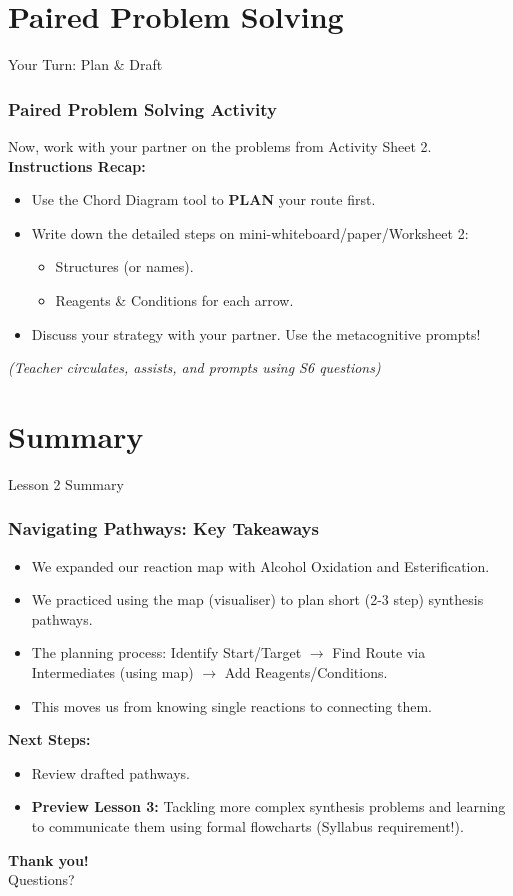 \documentclass[xcolor=svgnames]{beamer}
\begin{document}
\section{Paired Problem Solving}
\begin{frame}{Your Turn: Plan & Draft}
    \frametitle{Paired Problem Solving Activity}
    Now, work with your partner on the problems from Activity Sheet 2.
    \vspace{1em}
    \textbf{Instructions Recap:}
    \begin{itemize}
        \item Use the Chord Diagram tool to \textbf{PLAN} your route first.
        \item Write down the detailed steps on mini-whiteboard/paper/Worksheet 2:
            \begin{itemize}
                \item Structures (or names).
                \item Reagents \& Conditions for each arrow.
            \end{itemize}
        \item Discuss your strategy with your partner. Use the metacognitive prompts!
    \end{itemize}
    \vspace{1em}
    \textit{(Teacher circulates, assists, and prompts using S6 questions)}
\end{frame}

\section{Summary}
\begin{frame}{Lesson 2 Summary}
    \frametitle{Navigating Pathways: Key Takeaways}
    \begin{itemize}
        \item We expanded our reaction map with Alcohol Oxidation and Esterification.
        \item We practiced using the map (visualiser) to plan short (2-3 step) synthesis pathways.
        \item The planning process: Identify Start/Target $\rightarrow$ Find Route via Intermediates (using map) $\rightarrow$ Add Reagents/Conditions.
        \item This moves us from knowing single reactions to connecting them.
    \end{itemize}
    \vspace{1em}
    \textbf{Next Steps:}
    \begin{itemize}
        \item Review drafted pathways.
        \item \textbf{Preview Lesson 3:} Tackling more complex synthesis problems and learning to communicate them using formal flowcharts (Syllabus requirement!).
    \end{itemize}
\end{frame}

\begin{frame}
    \centering
    \textbf{Thank you!}\\ \vspace{1em} Questions?
\end{frame}
\end{document}
